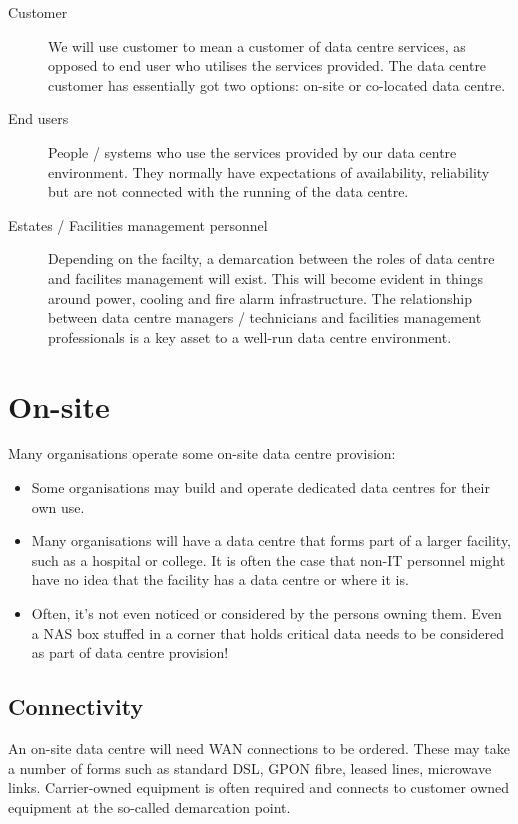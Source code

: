 \begin{description}
\item[Customer]
  We will use customer to mean a customer of data centre services, as opposed to end user who utilises the services provided.
  The data centre customer has essentially got two options: on-site or co-located data centre.
\item[End users]
  People / systems who use the services provided by our data centre environment.
  They normally have expectations of availability, reliability but are not connected with the running of the data centre.
\item[Estates / Facilities management personnel]
  Depending on the facilty, a demarcation between the roles of data centre and facilites management will exist.
  This will become evident in things around power, cooling and fire alarm infrastructure.
  The relationship between data centre managers / technicians and facilities management professionals is a key asset to a well-run data centre environment.
\end{description}
  
\section{On-site}

Many organisations operate some on-site data centre provision:
\begin{itemize}
\item
  Some organisations may build and operate dedicated data centres for their own use.
\item
  Many organisations will have a data centre that forms part of a larger facility, such as a hospital or college.
  It is often the case that non-IT personnel might have no idea that the facility has a data centre or where it is.
\item 
  Often, it's not even noticed or considered by the persons owning them.
  Even a NAS box stuffed in a corner that holds critical data needs to be considered as part of data centre provision!
\end{itemize}

\subsection{Connectivity}

An on-site data centre will need WAN connections to be ordered.
These may take a number of forms such as standard DSL, GPON fibre, leased lines, microwave links.
Carrier-owned equipment is often required and connects to customer owned equipment at the so-called demarcation point.


